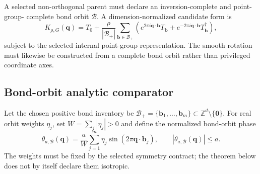\documentclass[11pt]{article}
\newcommand{\Z}{\mathbb Z}
\begin{document}
A selected non-orthogonal parent must declare an inversion-complete and point-group-
complete bond orbit $\mathcal B$. A dimension-normalized candidate form is
\begin{equation}
 K_{\rho,G}(\mathbf q)=T_0+
 \frac{\rho}{|\mathcal B_+|}
 \sum_{\mathbf b\in\mathcal B_+}
 \left(e^{2\pi i\mathbf q\cdot\mathbf b}T_{\mathbf b}
 +e^{-2\pi i\mathbf q\cdot\mathbf b}T_{\mathbf b}^\dagger\right),
 \label{eq:general-parent}
\end{equation}
subject to the selected internal point-group representation. The smooth rotation must
likewise be constructed from a complete bond orbit rather than privileged coordinate
axes.

\subsection{Bond-orbit analytic comparator}

Let the chosen positive bond inventory be
$\mathcal B_+=\{\mathbf b_1,\ldots,\mathbf b_m\}\subset\Z^d\setminus\{\mathbf0\}$.
For real orbit weights $\eta_j$, set $W=\sum_j|\eta_j|>0$ and define the normalized
bond-orbit phase
\begin{equation}
 \theta_{a,\mathcal B}(\mathbf q)
 =\frac{a}{W}\sum_{j=1}^m\eta_j
   \sin(2\pi\mathbf q\cdot\mathbf b_j),
 \qquad |\theta_{a,\mathcal B}(\mathbf q)|\le a.
 \label{eq:bond-orbit-phase}
\end{equation}
The weights must be fixed by the selected symmetry contract; the theorem below does not
by itself declare them isotropic.
\end{document}
